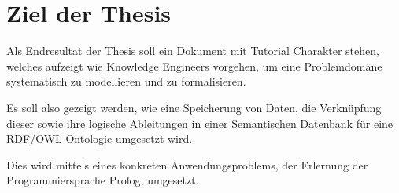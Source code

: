\chapter{Ziel der Thesis}
\label{chap:thesisziel}
Als Endresultat der Thesis soll ein Dokument mit Tutorial Charakter stehen, welches aufzeigt wie Knowledge Engineers vorgehen, um eine Problemdomäne systematisch zu modellieren und zu formalisieren. 

Es soll also gezeigt werden, wie eine Speicherung von Daten, die Verknüpfung dieser sowie ihre logische Ableitungen in einer Semantischen Datenbank für eine RDF/OWL-Ontologie  umgesetzt wird.~\cite{Aufgabenstellung}

 
Dies wird mittels eines konkreten Anwendungsproblems, der Erlernung der Programmiersprache Prolog, umgesetzt.
